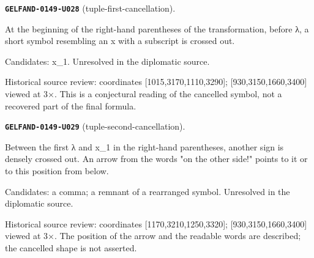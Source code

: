 \documentclass[11pt]{article}
\theoremstyle{definition}
\theoremstyle{remark}
\begin{document}
\noindent\leavevmode{}\label{GELFAND-P001372:tuple-first-cancellation:note}\textbf{\texttt{GELFAND-0149-U028}} (tuple-first-cancellation).\par\nopagebreak[4]
At the beginning of the right-hand parentheses of the transformation, before λ, a short symbol resembling an x with a subscript is crossed out.\par
Candidates: x\_1. Unresolved in the diplomatic source.\par
Historical source review: coordinates [1015,3170,1110,3290]; [930,3150,1660,3400] viewed at 3×. This is a conjectural reading of the cancelled symbol, not a recovered part of the final formula.\par\medskip
\noindent\leavevmode{}\label{GELFAND-P001372:tuple-second-cancellation:note}\textbf{\texttt{GELFAND-0149-U029}} (tuple-second-cancellation).\par\nopagebreak[4]
Between the first λ and x\_1 in the right-hand parentheses, another sign is densely crossed out. An arrow from the words "on the other side!" points to it or to this position from below.\par
Candidates: a comma; a remnant of a rearranged symbol. Unresolved in the diplomatic source.\par
Historical source review: coordinates [1170,3210,1250,3320]; [930,3150,1660,3400] viewed at 3×. The position of the arrow and the readable words are described; the cancelled shape is not asserted.\par\medskip
\end{document}

